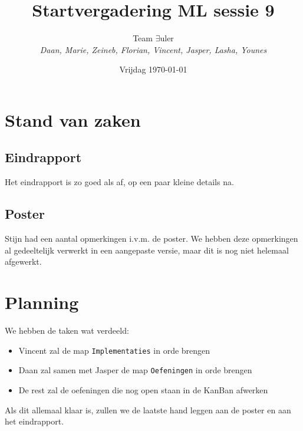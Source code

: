 \documentclass{article}
\title{Startvergadering ML sessie 9}
\author{Team $\exists$uler\\
	\textit{Daan, Marie, Zeineb, Florian, Vincent, Jasper, Lasha, Younes}}
\date{Vrijdag \today}
\begin{document}
	
	\maketitle
	
	\section*{Stand van zaken}
	
	\subsection*{Eindrapport}
	
	Het eindrapport is zo goed als af, op een paar kleine details na.
	
	\subsection*{Poster}
	
	Stijn had een aantal opmerkingen i.v.m. de poster. We hebben deze opmerkingen al gedeeltelijk verwerkt in een aangepaste versie, maar dit is nog niet helemaal afgewerkt.
	
	\section*{Planning}
	
	We hebben de taken wat verdeeld:
	
	\begin{itemize}
		\item Vincent zal de map \texttt{Implementaties} in orde brengen
		\item Daan zal samen met Jasper de map \texttt{Oefeningen} in orde brengen
		\item De rest zal de oefeningen die nog open staan in de KanBan afwerken
	\end{itemize}
	
	\noindent Als dit allemaal klaar is, zullen we de laatste hand leggen aan de poster en aan het eindrapport.
	
\end{document}
